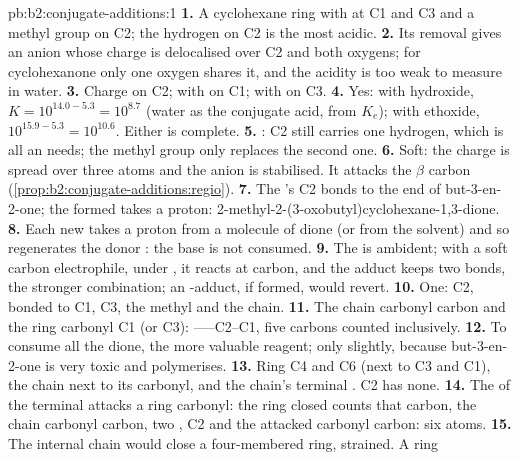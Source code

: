 \begin{solution}{pb:b2:conjugate-additions:1}
\textbf{1.} A cyclohexane ring with  at C1 and C3 and a methyl group on C2; the hydrogen on C2
is the most acidic.
\textbf{2.} Its removal gives an anion whose charge is delocalised over C2 and both oxygens; for
cyclohexanone only one oxygen shares it, and the acidity is too weak to measure in water.
\textbf{3.} Charge on C2;  with  on C1;  with  on C3.
\textbf{4.} Yes: with hydroxide, $K = 10^{14.0 - 5.3} = 10^{8.7}$ (water as the conjugate acid, from
$K_e$); with ethoxide, $10^{15.9-5.3} = 10^{10.6}$. Either is complete.
\textbf{5.} : C2 still carries one hydrogen, which is all an  needs; the methyl
group only replaces the second one.
\textbf{6.} Soft: the charge is spread over three atoms and the anion is stabilised. It attacks the
$\beta$ carbon (\cref{prop:b2:conjugate-additions:regio}).
\textbf{7.} The 's C2 bonds to the  end of but-3-en-2-one; the  formed takes a
proton: 2-methyl-2-(3-oxobutyl)cyclohexane-1,3-dione.
\textbf{8.} Each new  takes a proton from a molecule of dione (or from the solvent) and so
regenerates the donor : the base is not consumed.
\textbf{9.} The  is ambident; with a soft carbon electrophile, under , it reacts
at carbon, and the  adduct keeps two  bonds, the stronger combination; an
-adduct, if formed, would revert.
\textbf{10.} One: C2, bonded to C1, C3, the methyl and the chain.
\textbf{11.} The chain carbonyl carbon and the ring carbonyl C1 (or C3): ------C2--C1,
five carbons counted inclusively.
\textbf{12.} To consume all the dione, the more valuable reagent; only slightly, because but-3-en-2-one
is very toxic and polymerises.
\textbf{13.} Ring C4 and C6 (next to C3 and C1), the chain  next to its carbonyl, and the chain's
terminal . C2 has none.
\textbf{14.} The  of the terminal  attacks a ring carbonyl: the ring closed counts that
carbon, the chain carbonyl carbon, two , C2 and the attacked carbonyl carbon: six atoms.
\textbf{15.} The internal chain   would close a four-membered ring, strained. A ring

\end{solution}
